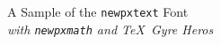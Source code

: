 \documentclass[11pt]{article}
\begin{document}
{\LARGE \noindent A Sample of the \texttt{newpxtext} Font}\\

{\large \noindent \textit{with \texttt{newpxmath} and \TeX\ Gyre Heros}}\\[5pt]


\end{document}
